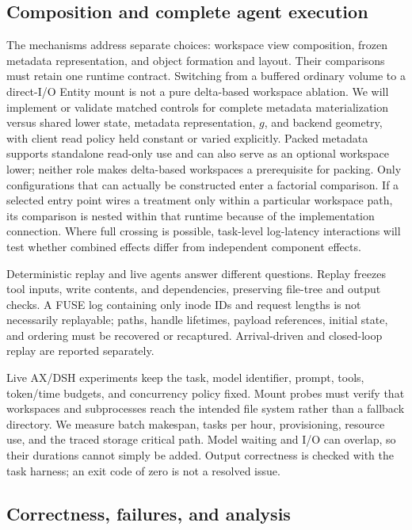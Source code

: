 \subsection{Composition and complete agent execution}

 The mechanisms address separate choices: workspace view
composition, frozen metadata representation, and object formation and layout.
Their comparisons must retain one runtime contract. Switching
from a buffered ordinary volume to a direct-I/O Entity mount is not a pure
delta-based workspace ablation. We will implement or validate matched controls for complete
metadata materialization versus shared lower state, metadata representation,
$g$, and backend geometry, with client read policy held constant or varied
explicitly. Packed metadata supports standalone read-only use and can also
serve as an optional workspace lower; neither role makes delta-based
workspaces a prerequisite for packing. Only configurations that can actually
be constructed enter a factorial comparison. If a selected entry point wires
a treatment only within a particular workspace path, its comparison is
nested within that runtime because of the implementation connection.
Where full crossing is possible, task-level log-latency interactions will
test whether combined effects differ from independent component effects.

 Deterministic replay and live agents answer different questions.
Replay freezes tool inputs, write contents, and dependencies, preserving
file-tree and output checks. A FUSE log containing only inode IDs and
request lengths is not necessarily replayable; paths, handle lifetimes,
payload references, initial state, and ordering must be recovered or
recaptured. Arrival-driven and closed-loop replay are reported separately.

Live AX/DSH experiments keep the task, model identifier, prompt, tools,
token/time budgets, and concurrency policy fixed. Mount probes must verify
that workspaces and subprocesses reach the intended file system rather than
a fallback directory. We measure batch makespan, tasks per hour,
provisioning, resource use, and the traced storage critical path. Model
waiting and I/O can overlap, so their durations cannot simply be added.
Output correctness is checked with the task harness; an exit code of zero
is not a resolved issue.

\subsection{Correctness, failures, and analysis}


